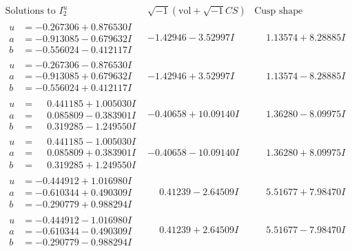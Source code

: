 \documentclass[1p]{elsarticle_modified}
\theoremstyle{definition}
\newcommand{\I}{\sqrt{-1}}
\begin{document}
$$\begin{array}{c|c|c}  
\text{Solutions to }I^u_{2}& \I (\text{vol} + \sqrt{-1}CS) & \text{Cusp shape}\\
 \hline 
\begin{aligned}
u &= -0.267306 + 0.876530 I \\
a &= -0.913085 - 0.679632 I \\
b &= -0.556024 - 0.412117 I\end{aligned}
 & -1.42946 - 3.52997 I & \phantom{-}1.13574 + 8.28885 I \\ \hline\begin{aligned}
u &= -0.267306 - 0.876530 I \\
a &= -0.913085 + 0.679632 I \\
b &= -0.556024 + 0.412117 I\end{aligned}
 & -1.42946 + 3.52997 I & \phantom{-}1.13574 - 8.28885 I \\ \hline\begin{aligned}
u &= \phantom{-}0.441185 + 1.005030 I \\
a &= \phantom{-}0.085809 - 0.383901 I \\
b &= \phantom{-}0.319285 - 1.249550 I\end{aligned}
 & -0.40658 + 10.09140 I & \phantom{-}1.36280 - 8.09975 I \\ \hline\begin{aligned}
u &= \phantom{-}0.441185 - 1.005030 I \\
a &= \phantom{-}0.085809 + 0.383901 I \\
b &= \phantom{-}0.319285 + 1.249550 I\end{aligned}
 & -0.40658 - 10.09140 I & \phantom{-}1.36280 + 8.09975 I \\ \hline\begin{aligned}
u &= -0.444912 + 1.016980 I \\
a &= -0.610344 + 0.490309 I \\
b &= -0.290779 + 0.988294 I\end{aligned}
 & \phantom{-}0.41239 - 2.64509 I & \phantom{-}5.51677 + 7.98470 I \\ \hline\begin{aligned}
u &= -0.444912 - 1.016980 I \\
a &= -0.610344 - 0.490309 I \\
b &= -0.290779 - 0.988294 I\end{aligned}
 & \phantom{-}0.41239 + 2.64509 I & \phantom{-}5.51677 - 7.98470 I \\ \hline\begin{aligned}

\end{aligned}
\end{array}$$
\end{document}
